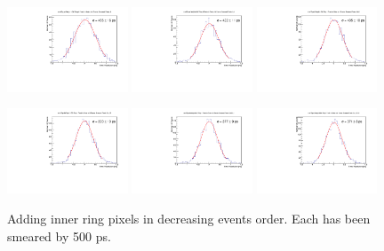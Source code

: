 \documentclass[12pt]{article}
\begin{document}
\begin{figure}[!bp]
\centering
	\includegraphics[width=0.32\textwidth]{SKIROC/SKIROC_1_Pixels_NoCenter500.pdf}
	\includegraphics[width=0.32\textwidth]{SKIROC/SKIROC_2_Pixels_NoCenter500.pdf}
	\includegraphics[width=0.32\textwidth]{SKIROC/SKIROC_3_Pixels_NoCenter500.pdf}

	\includegraphics[width=0.32\textwidth]{SKIROC/SKIROC_4_Pixels_NoCenter500.pdf}
	\includegraphics[width=0.32\textwidth]{SKIROC/SKIROC_5_Pixels_NoCenter500.pdf}
	\includegraphics[width=0.32\textwidth]{SKIROC/SKIROC_6_Pixels_NoCenter500.pdf}
	\caption{Adding inner ring pixels in decreasing events order.
		Each has been smeared by 500 ps.}
	\label{fig:500psAll_NoCenter}
\end{figure}
\end{document}
